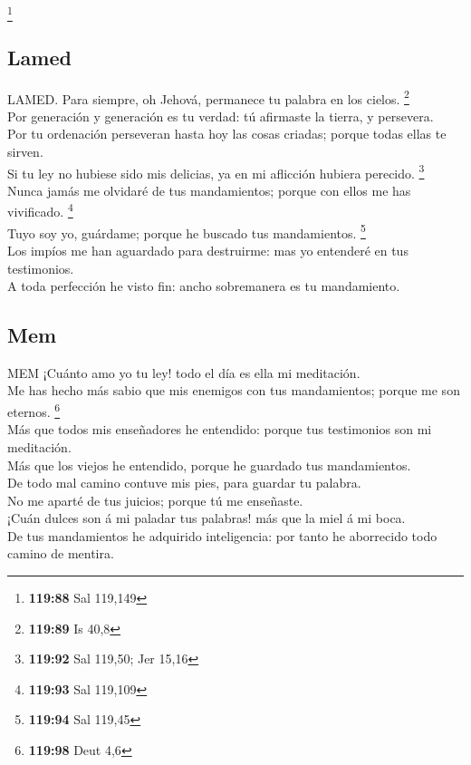 \footnote{\textbf{119:88} Sal 119,149}

\hypertarget{lamed}{%
\subsection{Lamed}\label{lamed}}

 LAMED. Para siempre, oh Jehová, permanece tu palabra en
los cielos. \footnote{\textbf{119:89} Is 40,8}\\
 Por generación y generación es tu verdad: tú afirmaste
la tierra, y persevera.\\
 Por tu ordenación perseveran hasta hoy las cosas
criadas; porque todas ellas te sirven.\\
 Si tu ley no hubiese sido mis delicias, ya en mi
aflicción hubiera perecido. \footnote{\textbf{119:92} Sal 119,50; Jer
  15,16}\\
 Nunca jamás me olvidaré de tus mandamientos; porque con
ellos me has vivificado. \footnote{\textbf{119:93} Sal 119,109}\\
 Tuyo soy yo, guárdame; porque he buscado tus
mandamientos. \footnote{\textbf{119:94} Sal 119,45}\\
 Los impíos me han aguardado para destruirme: mas yo
entenderé en tus testimonios.\\
 A toda perfección he visto fin: ancho sobremanera es tu
mandamiento.

\hypertarget{mem}{%
\subsection{Mem}\label{mem}}

 MEM ¡Cuánto amo yo tu ley! todo el día es ella mi
meditación.\\
 Me has hecho más sabio que mis enemigos con tus
mandamientos; porque me son eternos. \footnote{\textbf{119:98} Deut 4,6}\\
 Más que todos mis enseñadores he entendido: porque tus
testimonios son mi meditación.\\
 Más que los viejos he entendido, porque he guardado tus
mandamientos.\\
 De todo mal camino contuve mis pies, para guardar tu
palabra.\\
 No me aparté de tus juicios; porque tú me enseñaste.\\
 ¡Cuán dulces son á mi paladar tus palabras! más que la
miel á mi boca.\\
 De tus mandamientos he adquirido inteligencia: por
tanto he aborrecido todo camino de mentira.

